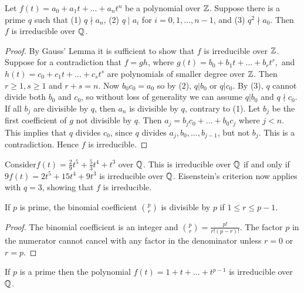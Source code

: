 \begin{theorem} \label{thm:eisenstein}
     Let
    $f(t) = a_0 + a_1 t + ... + a_n t^n$
    be a polynomial over $\mathbb Z$. Suppose there is a prime $q$ such that
    (1) $q \nmid a_n$, 
    (2) $q \mid a_i$ for $i = {0, 1,..., n-1}$, and 
    (3) $q^2 \nmid a_0$. 
    Then $f$ is irreducible over $\mathbb Q$. 
\end{theorem}

\begin{proof}
By Gauss' Lemma it is sufficient to show that $f$ is irreducible over $\mathbb Z$. Suppose for a contradiction that $f = gh$, where
$
g(t)=b_0+b_1 t+ ... +b_r t^r,
$
and
$
h(t)=c_0+c_1 t+ ... +c_s t^s
$
are polynomials of smaller degree over $\mathbb Z$. Then $r \ge 1, s \ge 1$ and $r+s = n$. Now $b_0 c_0 = a_0$ so by (2), $q | b_0$ or $q|c_0$. By (3), $q$ cannot divide both $b_0$ and $c_0$, so without
loss of generality we can assume $q | b_0$ and $q \nmid c_0$. If all $b_j$ are divisible by $q$, then $a_n$ is divisible by $q$, contrary to (1). Let $b_j$ be the first coefficient of $g$ not divisible by $q$. Then
$
a_j = b_j c_0 + ...+ b_0 c_j
$
where $j < n$. This implies that $q$ divides $c_0$, since $q$ divides $a_j, b_0,..., b_{j-1}$, but not $b_j$. This is a contradiction. Hence $f$ is irreducible.
\end{proof}

\begin{example}
Consider$
f(t) = \frac{2}{9} t^5 + \frac{5}{3} t^4 + t^3 
$ over $\mathbb Q$. This is irreducible over $\mathbb Q$ if and only if $
9f(t) = 2t^5 + 15t^4 + 9t^3
$
is irreducible over $\mathbb Q$. Eisenstein's criterion now applies with $q = 3$, showing that $f$ is irreducible.
\end{example}

\begin{theorem}
If $p$ is prime, the binomial coefficient $\binom{p}{r}$ is divisible by $p$ if $1 \le r \le p-1$.
\end{theorem}

\begin{proof}
The binomial coefficient is an integer and $\binom{p}{r} = \frac{p!}{r!(p-r)!}$. The factor $p$ in the numerator cannot cancel with any factor in the denominator unless $r=0$ or $r=p$.
\end{proof}

\begin{theorem}\label{thm:irreducible-prime-polynomial}
    If $p$ is a prime then the polynomial
    $
    f(t) = 1 + t + ... + t^{p-1}
    $
    is irreducible over $\mathbb Q$.
\end{theorem}


